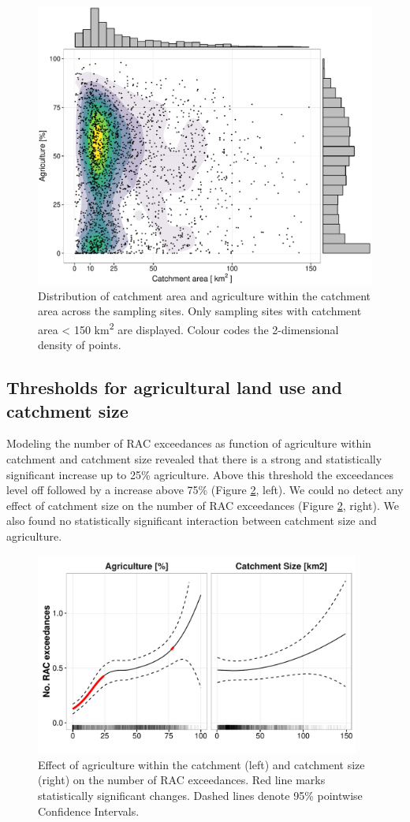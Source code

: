 \documentclass[journal=esthag,manuscript=article]{achemso}
\begin{document}
\begin{figure}[ht]
  \includegraphics[width=.8\textwidth]{figure3.pdf}
  \caption{Distribution of catchment area and agriculture within the catchment area across the sampling sites.
  Only sampling sites with catchment area < 150 km\textsuperscript{2} are displayed. 
  Colour codes the 2-dimensional density of points.}
  \label{fig:fig3}
\end{figure}



\subsection{Thresholds for agricultural land use and catchment size}
Modeling the number of RAC exceedances as function of agriculture within catchment and catchment size revealed that there is a strong and statistically significant increase up to 25\% agriculture.
Above this threshold the exceedances level off followed by a increase above 75\% (Figure \ref{fig:fig4}, left).
We could no detect any effect of catchment size on the number of RAC exceedances (Figure \ref{fig:fig4}, right).
We also found no statistically significant interaction between catchment size and agriculture.

\begin{figure}[ht]
  \includegraphics[width=0.95\textwidth]{figure4.pdf}
  \caption{Effect of agriculture within the catchment (left) and catchment size (right) on the number of RAC exceedances. Red line marks statistically significant changes. Dashed lines denote 95\% pointwise Confidence Intervals.
  }
  \label{fig:fig4}
\end{figure}
\end{document}
